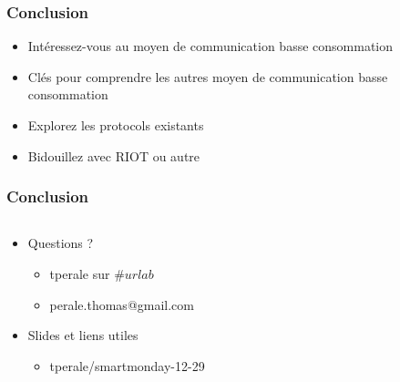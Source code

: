 \begin{frame}
\frametitle{Conclusion}
\begin{itemize}
  \item Intéressez-vous au moyen de communication basse consommation
  \item Clés pour comprendre les autres moyen de
    communication basse consommation
  \item Explorez les protocols existants
  \item Bidouillez avec RIOT ou autre
\end{itemize}
\end{frame}

\begin{frame}
\frametitle{Conclusion}
\begin{columns}
\begin{column}{0.5\textwidth}
\begin{itemize}
  \item Questions ?
  \begin{itemize}
    \item tperale sur $\#urlab$
    \item perale.thomas@gmail.com
  \end{itemize}
  \item Slides et liens utiles
  \begin{itemize}
    \item tperale/smartmonday-12-29
  \end{itemize}
\end{itemize}
\end{column}
\begin{column}{0.5\textwidth}
\end{column}
\end{columns}
\end{frame}
